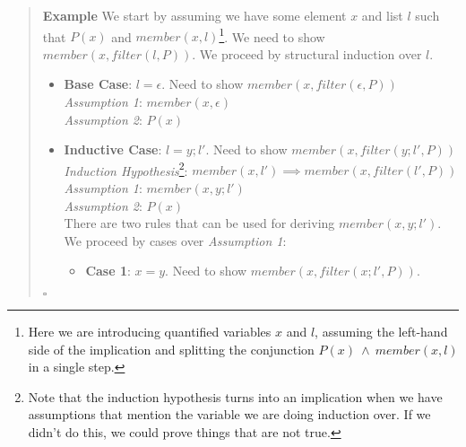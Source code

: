 \documentclass{tufte-handout}
\newcounter{example}
\newenvironment{example}
{\refstepcounter{example}\begin{quote}
\textbf{Example \arabic{example}}}
{

$\square$\end{quote}}
\begin{document}
\begin{example}
  We start by assuming we have some element $x$ and list $l$ such
  that $P(x)$ and $\mathit{member}(x, l)$\footnote{Here we are
    introducing quantified variables $x$ and $l$, assuming the
    left-hand side of the implication and splitting the
    conjunction $P(x) ~\land~ \mathit{member}(x, l)$ in a single
    step.}. We need to show
  $\mathit{member}(x, \mathit{filter}(l, P))$. We proceed by
  structural induction over $l$.
  \begin{itemize}
  \item \textbf{Base Case}: $l = \epsilon$. Need to show $\mathit{member}(x, \mathit{filter}(\epsilon, P))$\\
    \textit{Assumption 1}: $\mathit{member}(x, \epsilon)$\\
    \textit{Assumption 2}: $P(x)$\\
  \item \textbf{Inductive Case}: $l = y; l'$. Need to show
    $\mathit{member}(x, \mathit{filter}(y; l', P))$\\
    \textit{Induction Hypothesis}\footnote{Note that the induction
      hypothesis turns into an implication when we have
      assumptions that mention the variable we are doing induction
      over. If we didn't do this, we could prove things that are
      not true. }:
    $\mathit{member}(x, l') \implies \mathit{member}(x,
    \mathit{filter}(l', P))$\\
    \textit{Assumption 1}: $\mathit{member}(x, y; l')$\\
    \textit{Assumption 2}: $P(x)$\\
    There are two rules that can be used for deriving
    $\mathit{member}(x, y; l')$. We proceed by cases over
    \textit{Assumption 1}:
    \begin{itemize}
      \item \textbf{Case 1}: $x = y$. Need to show
        $\mathit{member}(x, \mathit{filter}(x; l', P))$.
\end{itemize}
\end{itemize}
\end{example}
\end{document}
